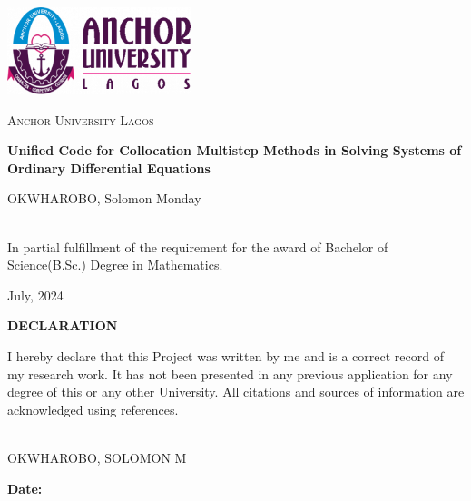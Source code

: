 \documentclass[a4paper, twoside]{report} %
\begin{document}
\fontsize{13}{15}\selectfont

\fancyfoot[C]{\thepage} %

\begin{titlepage}
   \centering
   \vspace*{1cm}
   \includegraphics[width=0.4\textwidth]{aul_logo.png}\par
   \vspace{1.5cm}
   {\scshape\LARGE Anchor University Lagos \par}
   \vspace{1cm}
   \vspace{1.5cm}
   {\huge\bfseries Unified Code for Collocation Multistep Methods in Solving Systems of Ordinary Differential Equations\par}
   \vspace{2cm}
   {\Large OKWHAROBO, Solomon Monday\par}
   \vfill
  
   
    \\
   In partial fulfillment of the requirement for the award of Bachelor of Science(B.Sc.) Degree in Mathematics.
   

   \vfill

   {\large July, 2024 \par}
\end{titlepage}

\newpage
\thispagestyle{empty}
\mbox{}

\begin{titlepage}
  \begin{center}
    \textbf{\huge DECLARATION}
\end{center}

\vspace{1cm}

\noindent
I hereby declare that this Project was written by me and is a correct record of my research work. It has not been presented in any previous application for any degree of this or any other University. All citations and sources of information are acknowledged using references.

\vfill

\noindent
\makebox[3in]{\hrulefill} \\
OKWHAROBO, SOLOMON M \\

\vspace{1cm}

\noindent
\textbf{Date:} \makebox[2in]{\hrulefill}
\end{titlepage}
\end{document}
